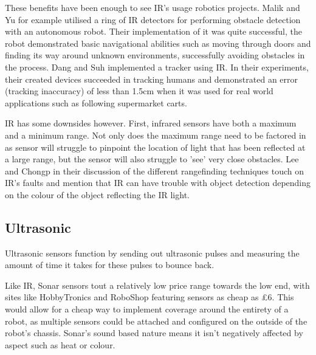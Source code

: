 				These benefits have been enough to see IR's usage robotics projects. Malik and Yu\citep{malik1992infrared} for example utilised a ring of IR detectors for performing obstacle detection with an autonomous robot. Their implementation of it was quite successful, the robot demonstrated basic navigational abilities such as moving through doors and finding its way around unknown environments, successfully avoiding obstacles in the process. Dang and Suh\citep{dang2011human} implemented a tracker using IR. In their experiments, their created devices succeeded in tracking humans and demonstrated an error (tracking inaccuracy) of less than 1.5cm when it was used for real world applications such as following supermarket carts.
				
				IR has some downsides however. First, infrared sensors have both a maximum and a minimum range. Not only does the maximum range need to be factored in as sensor will struggle to pinpoint the location of light that has been reflected at a large range, but the sensor will also struggle to 'see' very close obstacles. Lee and Chongp\cite{lee2011low} in their discussion of the different rangefinding techniques touch on IR's faults and mention that IR can have trouble with object detection depending on the colour of the object reflecting the IR light.
				
				\subsection{Ultrasonic}
				\label{litreview:ultrasonic}
				Ultrasonic sensors function by sending out ultrasonic pulses and measuring the amount of time it takes for these pulses to bounce back. 
				
				Like IR, Sonar sensors tout a relatively low price range towards the low end, with sites like HobbyTronics and RoboShop featuring sensors as cheap as \pounds{6}.  This would allow for a cheap way to implement coverage around the entirety of a robot, as multiple sensors could be attached and configured on the outside of the robot's chassis. Sonar's sound based nature means it isn't negatively affected by aspect such as heat or colour. 
				
